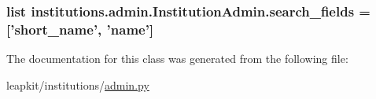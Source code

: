 \hypertarget{classinstitutions_1_1admin_1_1_institution_admin_ade305dfb85c4bc85b22046a73e047bb8}{
\subsubsection[{search\-\_\-fields}]{\setlength{\rightskip}{0pt plus 5cm}list institutions.\-admin.\-Institution\-Admin.\-search\-\_\-fields = \mbox{[}'short\-\_\-name', 'name'\mbox{]}\hspace{0.3cm}{\ttfamily [static]}}}\label{classinstitutions_1_1admin_1_1_institution_admin_ade305dfb85c4bc85b22046a73e047bb8}


The documentation for this class was generated from the following file\-:\begin{DoxyCompactItemize}
\item 
leapkit/institutions/\hyperlink{institutions_2admin_8py}{admin.\-py}\end{DoxyCompactItemize}
